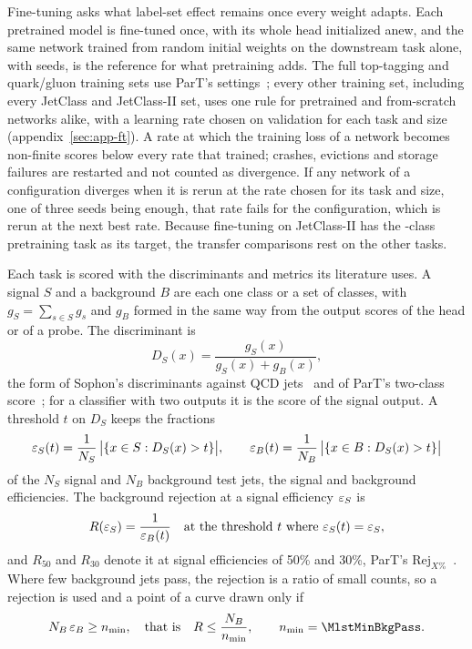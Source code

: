 Fine-tuning asks what label-set effect remains once every weight adapts. Each pretrained model is fine-tuned
once, with its whole head initialized anew, and the same network trained from random initial weights on the
downstream task alone, with \MlstFtRefSeedsWord{} seeds, is the reference for what pretraining adds. The full
top-tagging and quark/gluon training sets use ParT's settings~\cite{part}; every other training set, including
every JetClass and JetClass-II set, uses one rule for pretrained and from-scratch networks alike, with a learning
rate chosen on validation for each task and size (appendix~\ref{sec:app-ft}). A rate at which the training loss of a
network becomes non-finite scores below every rate that trained; crashes, evictions and storage failures are
restarted and not counted as divergence. If any network of a configuration diverges when it
is rerun at the rate chosen for its task and size, one of three seeds being enough, that rate fails for the
configuration, which is rerun at the next best rate. %
Because fine-tuning on JetClass-II
has the \Kfull-class pretraining task as its target, the transfer comparisons rest on the other tasks.

Each task is scored with the discriminants and metrics its literature uses. A signal $S$ and a background $B$
are each one class or a set of classes, with $g_S = \sum_{s\in S} g_s$ and $g_B$ formed in the same way from the
output scores of the head or of a probe. The discriminant is
\begin{equation}\label{eq:discr}
  D_S(x) = \frac{g_S(x)}{g_S(x) + g_B(x)} ,
\end{equation}
the form of Sophon's discriminants against QCD jets~\cite[Eqs.~(4) and~(5)]{sophon} and of ParT's two-class
score~\cite[Eq.~(2)]{part}; for a classifier with two outputs it is the score of the signal output. A threshold
$t$ on $D_S$ keeps the fractions
\begin{equation}\label{eq:eff}
  \varepsilon_S(t) = \frac{1}{N_S}\,\bigl|\{x\in S : D_S(x) > t\}\bigr| , \qquad
  \varepsilon_B(t) = \frac{1}{N_B}\,\bigl|\{x\in B : D_S(x) > t\}\bigr|
\end{equation}
of the $N_S$ signal and $N_B$ background test jets, the signal and background efficiencies. The background
rejection at a signal efficiency $\varepsilon_S$ is
\begin{equation}\label{eq:rej}
  R(\varepsilon_S) = \frac{1}{\varepsilon_B(t)} \quad \text{at the threshold $t$ where } \varepsilon_S(t) = \varepsilon_S ,
\end{equation}
and $R_{50}$ and $R_{30}$ denote it at signal efficiencies of 50\% and 30\%, ParT's
$\mathrm{Rej}_{X\%}$~\cite[Eq.~(1)]{part}. Where few background jets pass, the rejection is a ratio of small
counts, so a rejection is used and a point of a curve drawn only if
\begin{equation}\label{eq:cut}
  N_B\,\epsB \ge \nmin , \quad\text{that is}\quad R \le \frac{N_B}{\nmin} , \qquad \nmin = \MlstMinBkgPass .
\end{equation}

